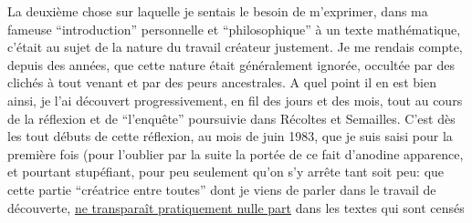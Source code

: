 La deuxième chose sur laquelle je sentais le besoin de m'exprimer, dans ma fameuse ``introduction''
 personnelle et ``philosophique'' à un texte mathématique,
c'était au sujet de la nature du travail créateur justement.
Je me rendais compte, depuis des années, que cette nature était généralement ignorée,
occultée par des clichés à tout venant et par des peurs ancestrales.
A quel point il en est bien ainsi, je l'ai découvert
progressivement, en fil des jours et des mois, tout au cours de la réflexion et de ``l'enquête''
poursuivie dans Récoltes et Semailles.
C'est dès les tout débuts de cette réflexion, au mois de juin 1983, que je suis saisi pour la première fois
(pour l'oublier par la suite
la portée de ce fait d'anodine apparence, et pourtant  stupéfiant,
pour peu seulement qu'on s'y arrête tant soit peu: que cette partie ``créatrice entre toutes''
dont je viens de parler dans le travail de découverte,
\uline{ne transparaît pratiquement nulle part} dans les textes qui sont censés
